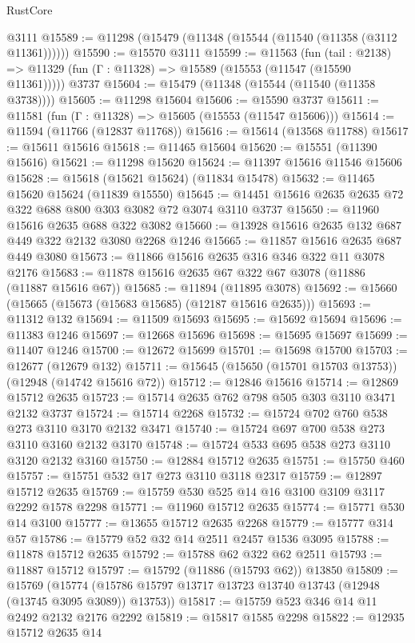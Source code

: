 \begin{lexlean}{RustCore}
\begin{coremodule}
    @3111
@15589 := @11298 (@15479 (@11348 (@15544 (@11540 (@11358 (@3112 @11361))))))
@15590 := @15570 @3111
@15599 := @11563
    (fun (tail : @2138) => @11329 (fun (Γ : @11328) => @15589 (@15553 (@11547 (@15590 @11361)))))
    @3737
@15604 := @15479 (@11348 (@15544 (@11540 (@11358 @3738))))
@15605 := @11298 @15604
@15606 := @15590 @3737
@15611 := @11581 (fun (Γ : @11328) => @15605 (@15553 (@11547 @15606)))
@15614 := @11594 (@11766 (@12837 @11768))
@15616 := @15614 (@13568 @11788)
@15617 := @15611 @15616
@15618 := @11465 @15604
@15620 := @15551 (@11390 @15616)
@15621 := @11298 @15620
@15624 := @11397 @15616 @11546 @15606
@15628 := @15618 (@15621 @15624) (@11834 @15478)
@15632 := @11465 @15620 @15624 (@11839 @15550)
@15645 := @14451 @15616 @2635 @2635 @72 @322 @688 @800 @303 @3082 @72 @3074 @3110 @3737
@15650 := @11960 @15616 @2635 @688 @322 @3082
@15660 := @13928 @15616 @2635 @132 @687 @449 @322 @2132 @3080 @2268 @1246
@15665 := @11857 @15616 @2635 @687 @449 @3080
@15673 := @11866 @15616 @2635 @316 @346 @322 @11 @3078 @2176
@15683 := @11878 @15616 @2635 @67 @322 @67 @3078 (@11886 (@11887 @15616 @67))
@15685 := @11894 (@11895 @3078)
@15692 := @15660 (@15665 (@15673 (@15683 @15685) (@12187 @15616 @2635)))
@15693 := @11312 @132
@15694 := @11509 @15693
@15695 := @15692 @15694
@15696 := @11383 @1246
@15697 := @12668 @15696
@15698 := @15695 @15697
@15699 := @11407 @1246
@15700 := @12672 @15699
@15701 := @15698 @15700
@15703 := @12677 (@12679 @132)
@15711 := @15645 (@15650 (@15701 @15703 @13753)) (@12948 (@14742 @15616 @72))
@15712 := @12846 @15616
@15714 := @12869 @15712 @2635
@15723 := @15714 @2635 @762 @798 @505 @303 @3110 @3471 @2132 @3737
@15724 := @15714 @2268
@15732 := @15724 @702 @760 @538 @273 @3110 @3170 @2132 @3471
@15740 := @15724 @697 @700 @538 @273 @3110 @3160 @2132 @3170
@15748 := @15724 @533 @695 @538 @273 @3110 @3120 @2132 @3160
@15750 := @12884 @15712 @2635
@15751 := @15750 @460
@15757 := @15751 @532 @17 @273 @3110 @3118 @2317
@15759 := @12897 @15712 @2635
@15769 := @15759 @530 @525 @14 @16 @3100 @3109 @3117 @2292 @1578 @2298
@15771 := @11960 @15712 @2635
@15774 := @15771 @530 @14 @3100
@15777 := @13655 @15712 @2635 @2268
@15779 := @15777 @314 @57
@15786 := @15779 @52 @32 @14 @2511 @2457 @1536 @3095
@15788 := @11878 @15712 @2635
@15792 := @15788 @62 @322 @62 @2511
@15793 := @11887 @15712
@15797 := @15792 (@11886 (@15793 @62)) @13850
@15809 := @15769
    (@15774 (@15786 @15797 @13717 @13723 @13740 @13743 (@12948 (@13745 @3095 @3089)) @13753))
@15817 := @15759 @523 @346 @14 @11 @2492 @2132 @2176 @2292
@15819 := @15817 @1585 @2298
@15822 := @12935 @15712 @2635 @14

\end{coremodule}
\end{lexlean}
